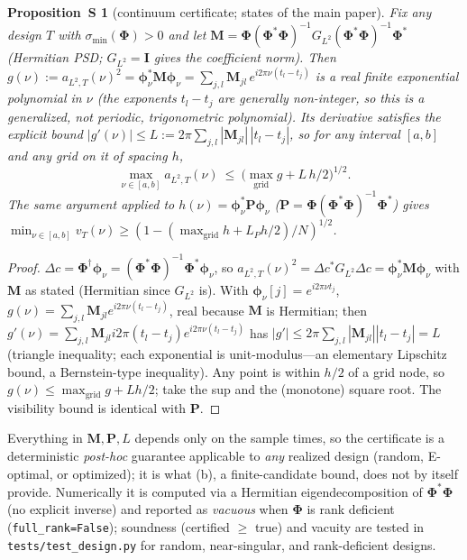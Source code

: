 \documentclass[10pt]{article}
\newtheorem{proposition}{Proposition~S}
\newcommand{\Phimat}{\bm{\Phi}}
\newcommand{\vt}{v_T}
\begin{document}
\begin{proposition}[continuum certificate; states \MPropCert{} of the main paper]
\label{prop:cert-s}
Fix any design $T$ with $\sigma_{\min}(\Phimat)>0$ and let $\bm M=\Phimat(\Phimat^{*}
\Phimat)^{-1}G_{L^2}(\Phimat^{*}\Phimat)^{-1}\Phimat^{*}$ (Hermitian PSD; $G_{L^2}=\bm I$
gives the coefficient norm).  Then $g(\nu):=a_{L^2,T}(\nu)^2=\bm\phi_\nu^{*}\bm M\bm\phi_\nu
=\sum_{j,l}\bm M_{jl}\,e^{i2\pi\nu(t_l-t_j)}$ is a real \emph{finite exponential polynomial}
in $\nu$ (the exponents $t_l-t_j$ are generally non-integer, so this is a generalized, not
periodic, trigonometric polynomial).  Its derivative satisfies the explicit bound
$|g'(\nu)|\le L:=2\pi\sum_{j,l}|\bm M_{jl}|\,|t_l-t_j|$, so for any interval $[a,b]$ and any
grid on it of spacing $h$,
\[
\max_{\nu\in[a,b]}a_{L^2,T}(\nu)\ \le\ \Big(\max_{\text{grid}} g+L\,h/2\Big)^{1/2}.
\]
The same argument applied to $h(\nu)=\bm\phi_\nu^{*}\bm P\bm\phi_\nu$
($\bm P=\Phimat(\Phimat^{*}\Phimat)^{-1}\Phimat^{*}$) gives
$\min_{\nu\in[a,b]}\vt(\nu)\ge(1-(\max_{\text{grid}}h+L_P h/2)/N)^{1/2}$.
\end{proposition}
\begin{proof}
$\Delta c=\Phimat^\dagger\bm\phi_\nu=(\Phimat^{*}\Phimat)^{-1}\Phimat^{*}\bm\phi_\nu$, so
$a_{L^2,T}(\nu)^2=\Delta c^{*}G_{L^2}\Delta c=\bm\phi_\nu^{*}\bm M\bm\phi_\nu$ with $\bm M$
as stated (Hermitian since $G_{L^2}$ is).  With $\bm\phi_\nu[j]=e^{i2\pi\nu t_j}$,
$g(\nu)=\sum_{j,l}\bm M_{jl}e^{i2\pi\nu(t_l-t_j)}$, real because $\bm M$ is Hermitian; then
$g'(\nu)=\sum_{j,l}\bm M_{jl}i2\pi(t_l-t_j)e^{i2\pi\nu(t_l-t_j)}$ has
$|g'|\le2\pi\sum_{j,l}|\bm M_{jl}||t_l-t_j|=L$ (triangle inequality; each exponential is
unit-modulus---an elementary Lipschitz bound, a Bernstein-type inequality).
Any point is within $h/2$ of a grid node, so $g(\nu)\le\max_{\text{grid}}g+Lh/2$; take the
sup and the (monotone) square root.  The visibility bound is identical with $\bm P$.
\end{proof}
Everything in $\bm M,\bm P,L$ depends only on the sample times, so the certificate is a
deterministic \emph{post-hoc} guarantee applicable to \emph{any} realized design (random,
E-optimal, or optimized); it is what \MThmJitter(b), a finite-candidate bound, does not by
itself provide.  Numerically it is computed via a Hermitian eigendecomposition of
$\Phimat^{*}\Phimat$ (no explicit inverse) and reported as \emph{vacuous} when $\Phimat$ is
rank deficient (\texttt{full\_rank=False}); soundness (certified $\ge$ true) and vacuity are
tested in \texttt{tests/test\_design.py} for random, near-singular, and rank-deficient
designs.
\end{document}
